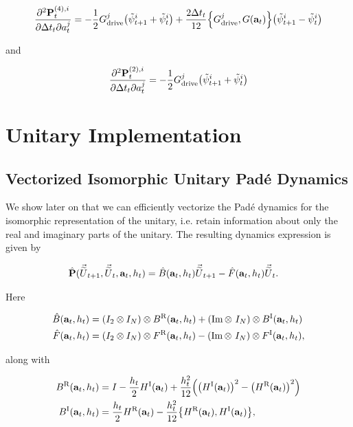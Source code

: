 \documentclass{article}
\newcommand{\isopsi}{\tilde \psi}
\newcommand{\isovecU}{\vec{\widetilde{U}}}
\newcommand{\HI}{H^{\text{I}}}
\newcommand{\HR}{H^{\text{R}}}
\newcommand{\BR}{B^{\text{R}}}
\newcommand{\BI}{B^{\text{I}}}
\newcommand{\FR}{F^{\text{R}}}
\newcommand{\FI}{F^{\text{I}}}
\begin{document}
\begin{equation}
  \pdv{\vb{P}_t^{(4),i}}{\Delta t_t}{a^j_t} 
    = -\frac{1}{2} G^j_{\text{drive}} \qty(\isopsi^i_{t+1} + \isopsi^i_{t}) 
    + \frac{2 \Delta t_t}{12} \qty{G^j_{\text{drive}}, G(\vb{a}_t)}\qty(\isopsi^i_{t+1} - \isopsi^i_{t})
\end{equation}

and


\begin{equation}
  \pdv{\vb{P}_t^{(2),i}}{\Delta t_t}{a^j_t} 
    = -\frac{1}{2} G^j_{\text{drive}} \qty(\isopsi^i_{t+1} + \isopsi^i_{t}) 
\end{equation}

\newpage

\section{Unitary Implementation}

\subsection{Vectorized Isomorphic Unitary Pad\'e Dynamics}

We show later on that we can efficiently vectorize the Pad\'e dynamics for the isomorphic representation of the unitary, i.e. retain information about only the real and imaginary parts of the unitary.  The resulting dynamics expression is given by

\begin{align*}
  \hat{\vb{P}}(\isovecU_{t+1}, \isovecU_t, \vb{a}_t, h_t) 
  &= \hat B(\vb{a}_t, h_t) \isovecU_{t+1} - \hat F(\vb{a}_t, h_t) \isovecU_{t}.
\end{align*}

\noindent
Here 

\begin{align*}
  \hat B(\vb{a}_t, h_t) &= \qty(I_2 \otimes I_N) \otimes \BR(\vb{a}_t, h_t) + (\Im \otimes \ I_N) \otimes \BI(\vb{a}_t, h_t) \\
  \hat F(\vb{a}_t, h_t) &= \qty(I_2 \otimes I_N) \otimes \FR(\vb{a}_t, h_t) - (\Im \otimes \ I_N) \otimes \FI(\vb{a}_t, h_t), 
\end{align*}

\noindent
along with

\begin{align*}
  \BR(\vb{a}_t, h_t) &= I - \frac{h_t}{2} \HI(\vb{a}_t) + \frac{h_t^2}{12}\qty(\qty(\HI(\vb{a}_t))^2 - \qty(\HR(\vb{a}_t))^2) \\
  \BI(\vb{a}_t, h_t) &= \frac{h_t}{2} \HR(\vb{a}_t) - \frac{h_t^2}{12}\qty{\HR(\vb{a}_t),\HI(\vb{a}_t)},
\end{align*}
\end{document}
